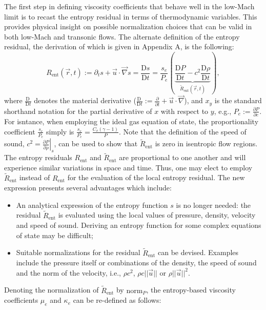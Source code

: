 \documentclass[review,10pt]{elsarticle}
\newcommand{\grad}{\vec{\nabla}}
\newcommand{\norm}{\textrm{norm}}
\newcommand{\resi}{R_\text{ent}}
\newcommand{\resinew}{\widetilde{R}_\text{ent}}
\newcommand{\matder}[1]{\frac{\textrm{D} #1}{\textrm{D} t}}
\newcommand{\eqt}[1]{Eq.~(\ref{#1})}                     %
\newcommand{\app}[1]{Appendix~\ref{#1}}                   %
\begin{document}
The first step in defining viscosity coefficients that behave well in the low-Mach limit is to recast 
the entropy residual in terms of thermodynamic variables. This provides physical insight on possible 
normalization choices that can be valid in both low-Mach and transonic flows. The alternate definition 
of the entropy residual, the derivation of which is given in Appendix A, is the following: %
%
\begin{equation}
\label{eq:ent_res}
\resi(\vec{r},t) := \partial_t s + \vec{u} \cdot \grad s = \matder{s} = \frac{s_e}{P_e} \left( \underbrace{\matder{P} - c^2 \matder{\rho} }_{\resinew(\vec{r},t)} \right) ,
\end{equation} 
%
where $\matder{\ }$ denotes the material derivative ($\matder{\ }:= \frac{\partial }{\partial t} + \vec{u} \cdot \grad $), and $x_y$ 
is the standard shorthand notation for the partial derivative of $x$ with respect to $y$, e.g., $P_e:=\frac{\partial P}{\partial e}$. 
%
For isntance, when employing the ideal gas equation of state, the proportionality coefficient $\frac{s_e}{P_e}$ simply is $\frac{s_e}{P_e} = \frac{C_v ( \gamma-1)}{P}$. Note that the definition of the speed of sound, $c^2 = \left. \frac{\partial P}{\partial \rho} \right|_s$, can be used to show that $\resinew$ is zero in isentropic flow regions. The entropy residuals $\resi$ and $\resinew$ are proportional to one another and will experience similar 
variations in space and time. Thus, one may elect to employ $\resinew$ instead of $\resi$ for the evaluation 
of the local entropy residual. The new expression presents several advantages which include:
%
\begin{itemize}
\item An analytical expression of the entropy function $s$ is no longer needed: the residual $\resinew$ is 
evaluated using the local values of pressure, density, velocity and speed of sound. Deriving an entropy 
function for some complex equations of state may be difficult;
\item Suitable normalizations for the residual $\resinew$ can be devised. Examples include the pressure 
itself or combinations of the density, the speed of sound and the norm of the velocity, 
i.e., $\rho c^2$, $\rho c || \vec{u} ||$ or $\rho || \vec{u} ||^2$. 
\end{itemize}
%
Denoting the normalization of $\resinew$ by $\norm_P$, the entropy-based viscosity coefficients $\mu_e$ 
and $\kappa_e$ can be re-defined as follows:
\end{document}
